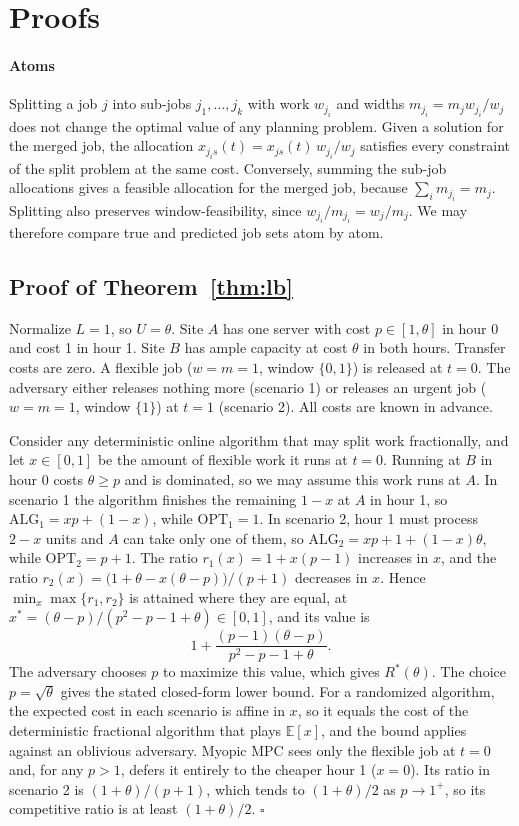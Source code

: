 \section{Proofs}\label{app:proofs}

\paragraph{Atoms} Splitting a job $j$ into sub-jobs $j_1,\dots,j_k$ with work $w_{j_i}$ and widths $m_{j_i}=m_jw_{j_i}/w_j$ does not change the optimal value of any planning problem. Given a solution for the merged job, the allocation $x_{j_i s}(t)=x_{js}(t)\,w_{j_i}/w_j$ satisfies every constraint of the split problem at the same cost. Conversely, summing the sub-job allocations gives a feasible allocation for the merged job, because $\sum_i m_{j_i}=m_j$. Splitting also preserves window-feasibility, since $w_{j_i}/m_{j_i}=w_j/m_j$. We may therefore compare true and predicted job sets atom by atom.

\subsection{Proof of Theorem~\ref{thm:lb}}

Normalize $L=1$, so $U=\theta$. Site $A$ has one server with cost $p\in[1,\theta]$ in hour 0 and cost 1 in hour 1. Site $B$ has ample capacity at cost $\theta$ in both hours. Transfer costs are zero. A flexible job ($w=m=1$, window $\{0,1\}$) is released at $t=0$. The adversary either releases nothing more (scenario 1) or releases an urgent job ($w=m=1$, window $\{1\}$) at $t=1$ (scenario 2). All costs are known in advance.

Consider any deterministic online algorithm that may split work fractionally, and let $x\in[0,1]$ be the amount of flexible work it runs at $t=0$. Running at $B$ in hour 0 costs $\theta\ge p$ and is dominated, so we may assume this work runs at $A$. In scenario 1 the algorithm finishes the remaining $1-x$ at $A$ in hour 1, so $\mathrm{ALG}_1=xp+(1-x)$, while $\mathrm{OPT}_1=1$. In scenario 2, hour 1 must process $2-x$ units and $A$ can take only one of them, so $\mathrm{ALG}_2=xp+1+(1-x)\theta$, while $\mathrm{OPT}_2=p+1$. The ratio $r_1(x)=1+x(p-1)$ increases in $x$, and the ratio $r_2(x)=\big(1+\theta-x(\theta-p)\big)/(p+1)$ decreases in $x$. Hence $\min_x\max\{r_1,r_2\}$ is attained where they are equal, at $x^*=(\theta-p)/(p^2-p-1+\theta)\in[0,1]$, and its value is
\[
1+\frac{(p-1)(\theta-p)}{p^2-p-1+\theta}.
\]
The adversary chooses $p$ to maximize this value, which gives $R^*(\theta)$. The choice $p=\sqrt\theta$ gives the stated closed-form lower bound. For a randomized algorithm, the expected cost in each scenario is affine in $x$, so it equals the cost of the deterministic fractional algorithm that plays $\mathbb{E}[x]$, and the bound applies against an oblivious adversary. Myopic MPC sees only the flexible job at $t=0$ and, for any $p>1$, defers it entirely to the cheaper hour 1 ($x=0$). Its ratio in scenario 2 is $(1+\theta)/(p+1)$, which tends to $(1+\theta)/2$ as $p\to 1^+$, so its competitive ratio is at least $(1+\theta)/2$. \hfill$\square$


